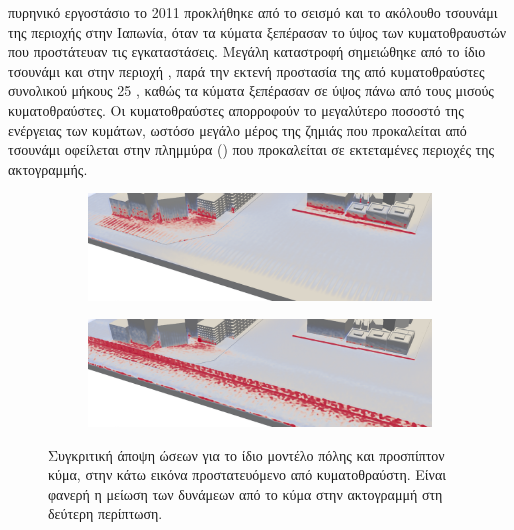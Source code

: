 πυρηνικό εργοστάσιο  το 2011 προκλήθηκε από το σεισμό και το
ακόλουθο τσουνάμι της περιοχής  στην Ιαπωνία, όταν τα κύματα ξεπέρασαν το ύψος
των κυματοθραυστών που προστάτευαν τις εγκαταστάσεις. Μεγάλη καταστροφή σημειώθηκε από το
ίδιο τσουνάμι και στην περιοχή , παρά την εκτενή προστασία της από
κυματοθραύστες συνολικού μήκους 25 , καθώς τα κύματα ξεπέρασαν σε ύψος πάνω από
τους μισούς κυματοθραύστες. Οι κυματοθραύστες απορροφούν το μεγαλύτερο ποσοστό της
ενέργειας των κυμάτων, ωστόσο μεγάλο μέρος της ζημιάς που προκαλείται από τσουνάμι
οφείλεται στην πλημμύρα () που προκαλείται σε εκτεταμένες περιοχές της
ακτογραμμής.

\begin{figure}[h!]
  \begin{subfigure}{\textwidth}
    \centering
    \includegraphics[width=\textwidth]{figures/if-city0-free.png}
  \end{subfigure}
  \begin{subfigure}{\textwidth}
    \centering
    \includegraphics[width=\textwidth]{figures/if-city0-seawall.png}
  \end{subfigure}
  \caption[Συμβολή κυματοθραύστη στην αποτροπή ζημιάς]{Συγκριτική άποψη 
    ώσεων για το ίδιο μοντέλο πόλης και προσπίπτον κύμα, στην κάτω εικόνα προστατευόμενο
    από κυματοθραύστη. Είναι φανερή η μείωση των δυνάμεων από το κύμα στην ακτογραμμή στη
    δεύτερη περίπτωση.}
  \label{fig:seawall-comparison}
\end{figure}

